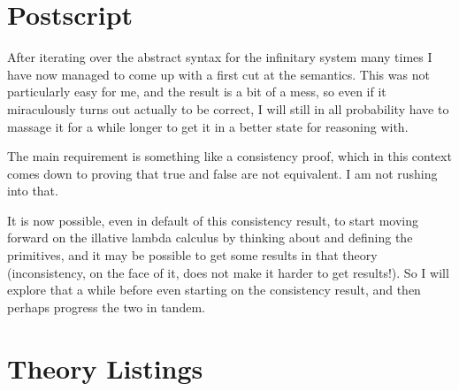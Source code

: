 
\section{Postscript}\label{POSTSCRIPT}

After iterating over the abstract syntax for the infinitary system many times I have now managed to come up with a first cut at the semantics.
This was not particularly easy for me, and the result is a bit of a mess, so even if it miraculously turns out actually to be correct, I will still in all probability have to massage it for a while longer to get it in a better state for reasoning with.

The main requirement is something like a consistency proof, which in this context comes down to proving that true and false are not equivalent.
I am not rushing into that.

It is now possible, even in default of this consistency result, to start moving forward on the illative lambda calculus by thinking about and defining the primitives, and it may be possible to get some results in that theory (inconsistency, on the face of it, does not make it harder to get results!).
So I will explore that a while before even starting on the consistency result, and then perhaps progress the two in tandem.

\pagebreak
\appendix

\section{Theory Listings}

\vfill

{
\let\Section\subsection
\let\Subsection\subsubsection
\def\subsection#1{\Subsection*{#1}}

\def\section#1{\Section{#1}\label{icomb}}

\pagebreak
\def\section#1{\Section{#1}\label{ilamb}}

}  %


